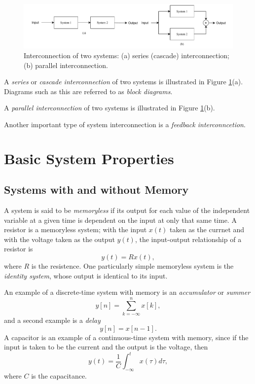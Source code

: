 \documentclass[a4paper,10pt,twoside]{book}
\begin{document}
\begin{figure}[htbp]
    \centering
    \includegraphics[width=\linewidth]{Fig3.pdf}
    \caption{Interconnection of two systems: (a) series (cascade) interconnection; (b) parallel interconnection.}
    \label{Fig3}
\end{figure}

A \textit{series} or \textit{cascade interconnection} of two systems is illustrated in Figure \ref{Fig3}(a). Diagrams such as this are referred to as \textit{block diagrams}.

A \textit{parallel interconnection} of two systems is illustrated in Figure \ref{Fig3}(b).

Another important type of system interconnection is a \textit{feedback interconncetion}.

\section{Basic System Properties}
\subsection{Systems with and without Memory}
\label{section:1.6.1}

A system is said to be \textit{memoryless} if its output for each value of the independent variable at a given time is dependent on the input at only that same time. A resistor is a memoryless system; with the input $x(t)$ taken as the currnet and with the voltage taken as the output $y(t)$, the input-output relationship of a resistor is
\begin{equation}
    y(t)=Rx(t),
    \label{1.91}
\end{equation}
where $R$ is the resistence. One particularly simple memoryless system is the \textit{identity system}, whose output is identical to its input.

An example of a discrete-time system with memory is an \textit{accumulator} or \textit{summer}
\begin{equation}
    y[n]=\sum\limits_{k=-\infty}^nx[k],
    \label{1.92}
\end{equation}
and a second example is a \textit{delay}
\begin{equation}
    y[n]=x[n-1].
    \label{1.93}
\end{equation}
A capacitor is an example of a continuous-time system with memory, since if the input is taken to be the current and the output is the voltage, then
\begin{equation}
    y(t)=\dfrac1C\int_{-\infty}^tx(\tau)d\tau,
    \label{1.94}
\end{equation}
where $C$ is the capacitance.
\end{document}
